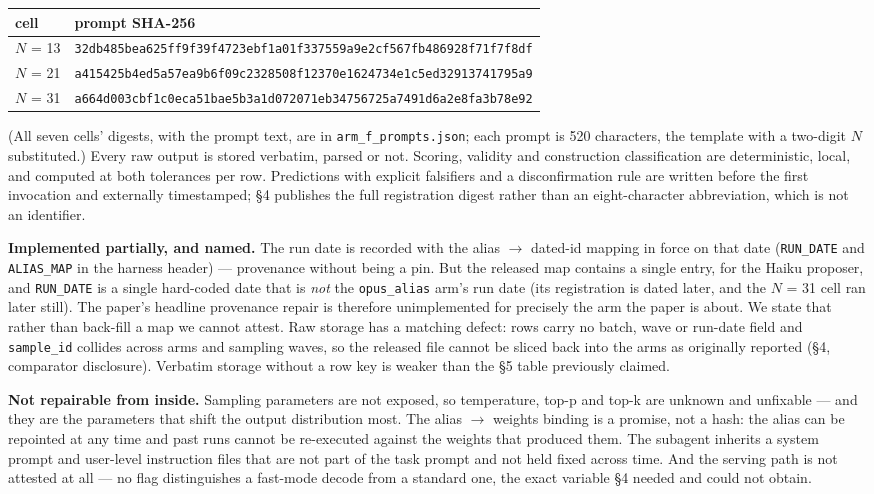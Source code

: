 \documentclass[11pt]{article}
\begin{document}
\begin{center}
\begin{tabular}{@{}ll@{}}
\toprule
cell & prompt SHA-256 \\
\midrule
$N$ = 13 & \texttt{\small 32db485bea625ff9f39f4723ebf1a01f337559a9e2cf567fb486928f71f7f8df} \\
$N$ = 21 & \texttt{\small a415425b4ed5a57ea9b6f09c2328508f12370e1624734e1c5ed32913741795a9} \\
$N$ = 31 & \texttt{\small a664d003cbf1c0eca51bae5b3a1d072071eb34756725a7491d6a2e8fa3b78e92} \\
\bottomrule
\end{tabular}
\end{center}

(All seven cells' digests, with the prompt text, are in \texttt{arm\_f\_prompts.json}; each prompt
is 520 characters, the template with a two-digit $N$ substituted.) Every raw output is
stored verbatim, parsed or not. Scoring, validity and construction classification are
deterministic, local, and computed at both tolerances per row. Predictions with explicit
falsifiers and a disconfirmation rule are written before the first invocation and
externally timestamped; \S4 publishes the full registration digest rather than an
eight-character abbreviation, which is not an identifier.

\textbf{Implemented partially, and named.} The run date is recorded with the alias $\rightarrow$ dated-id
mapping in force on that date (\texttt{RUN\_DATE} and \texttt{ALIAS\_MAP} in the harness header) ---
provenance without being a pin. But the released map contains a single entry, for the
Haiku proposer, and \texttt{RUN\_DATE} is a single hard-coded date that is \emph{not} the
\texttt{opus\_alias} arm's run date (its registration is dated later, and the $N$ = 31 cell ran
later still). The paper's headline provenance repair is therefore unimplemented for
precisely the arm the paper is about. We state that rather than back-fill a map we cannot
attest. Raw storage has a matching defect: rows carry no batch, wave or run-date field and
\texttt{sample\_id} collides across arms and sampling waves, so the released file cannot be sliced
back into the arms as originally reported (\S4, comparator disclosure). Verbatim storage
without a row key is weaker than the \S5 table previously claimed.

\textbf{Not repairable from inside.} Sampling parameters are not exposed, so temperature,
top-p and top-k are unknown and unfixable --- and they are the parameters that shift the
output distribution most. The alias $\rightarrow$ weights binding is a promise, not a hash: the alias
can be repointed at any time and past runs cannot be re-executed against the weights that
produced them. The subagent inherits a system prompt and user-level instruction files that
are not part of the task prompt and not held fixed across time. And the serving path is
not attested at all --- no flag distinguishes a fast-mode decode from a standard one, the
exact variable \S4 needed and could not obtain.
\end{document}
